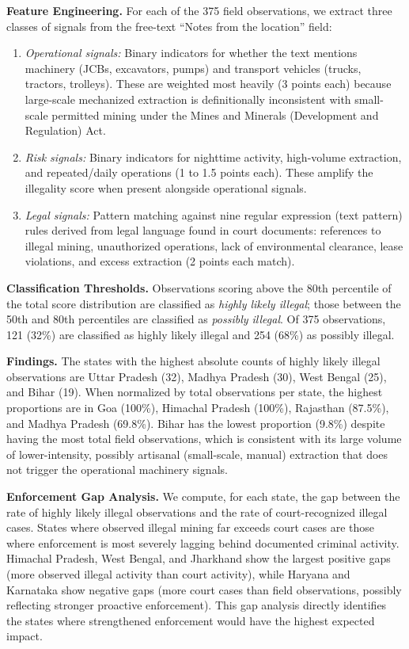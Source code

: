 \documentclass[12pt]{article}
\begin{document}
\textbf{Feature Engineering.} For each of the 375 field observations, we extract three classes of signals from the free-text ``Notes from the location'' field:

\begin{enumerate}
    \item \textit{Operational signals:} Binary indicators for whether the text mentions machinery (JCBs, excavators, pumps) and transport vehicles (trucks, tractors, trolleys). These are weighted most heavily (3 points each) because large-scale mechanized extraction is definitionally inconsistent with small-scale permitted mining under the Mines and Minerals (Development and Regulation) Act.
    \item \textit{Risk signals:} Binary indicators for nighttime activity, high-volume extraction, and repeated/daily operations (1 to 1.5 points each). These amplify the illegality score when present alongside operational signals.
    \item \textit{Legal signals:} Pattern matching against nine regular expression (text pattern) rules derived from legal language found in court documents: references to illegal mining, unauthorized operations, lack of environmental clearance, lease violations, and excess extraction (2 points each match).
\end{enumerate}

\textbf{Classification Thresholds.} Observations scoring above the 80th percentile of the total score distribution are classified as \textit{highly likely illegal}; those between the 50th and 80th percentiles are classified as \textit{possibly illegal}. Of 375 observations, 121 (32\%) are classified as highly likely illegal and 254 (68\%) as possibly illegal.

\textbf{Findings.} The states with the highest absolute counts of highly likely illegal observations are Uttar Pradesh (32), Madhya Pradesh (30), West Bengal (25), and Bihar (19). When normalized by total observations per state, the highest proportions are in Goa (100\%), Himachal Pradesh (100\%), Rajasthan (87.5\%), and Madhya Pradesh (69.8\%). Bihar has the lowest proportion (9.8\%) despite having the most total field observations, which is consistent with its large volume of lower-intensity, possibly artisanal (small-scale, manual) extraction that does not trigger the operational machinery signals.

\textbf{Enforcement Gap Analysis.} We compute, for each state, the gap between the rate of highly likely illegal observations and the rate of court-recognized illegal cases. States where observed illegal mining far exceeds court cases are those where enforcement is most severely lagging behind documented criminal activity. Himachal Pradesh, West Bengal, and Jharkhand show the largest positive gaps (more observed illegal activity than court activity), while Haryana and Karnataka show negative gaps (more court cases than field observations, possibly reflecting stronger proactive enforcement). This gap analysis directly identifies the states where strengthened enforcement would have the highest expected impact.
\end{document}
